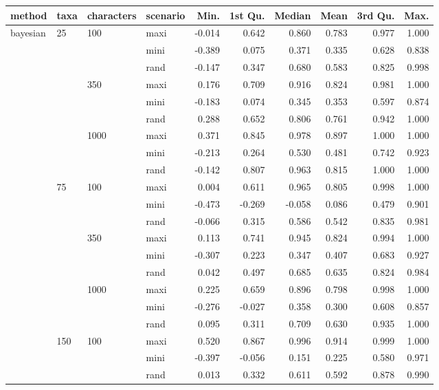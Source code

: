 \begin{longtable}{llllrrrrrr}
  \hline
method & taxa & characters & scenario & Min. & 1st Qu. & Median & Mean & 3rd Qu. & Max. \\ 
  \hline
bayesian & 25 & 100 & maxi & -0.014 & 0.642 & 0.860 & 0.783 & 0.977 & 1.000 \\ 
   &  &  & mini & -0.389 & 0.075 & 0.371 & 0.335 & 0.628 & 0.838 \\ 
   &  &  & rand & -0.147 & 0.347 & 0.680 & 0.583 & 0.825 & 0.998 \\ 
   &  & 350 & maxi & 0.176 & 0.709 & 0.916 & 0.824 & 0.981 & 1.000 \\ 
   &  &  & mini & -0.183 & 0.074 & 0.345 & 0.353 & 0.597 & 0.874 \\ 
   &  &  & rand & 0.288 & 0.652 & 0.806 & 0.761 & 0.942 & 1.000 \\ 
   &  & 1000 & maxi & 0.371 & 0.845 & 0.978 & 0.897 & 1.000 & 1.000 \\ 
   &  &  & mini & -0.213 & 0.264 & 0.530 & 0.481 & 0.742 & 0.923 \\ 
   &  &  & rand & -0.142 & 0.807 & 0.963 & 0.815 & 1.000 & 1.000 \\ 
   & 75 & 100 & maxi & 0.004 & 0.611 & 0.965 & 0.805 & 0.998 & 1.000 \\ 
   &  &  & mini & -0.473 & -0.269 & -0.058 & 0.086 & 0.479 & 0.901 \\ 
   &  &  & rand & -0.066 & 0.315 & 0.586 & 0.542 & 0.835 & 0.981 \\ 
   &  & 350 & maxi & 0.113 & 0.741 & 0.945 & 0.824 & 0.994 & 1.000 \\ 
   &  &  & mini & -0.307 & 0.223 & 0.347 & 0.407 & 0.683 & 0.927 \\ 
   &  &  & rand & 0.042 & 0.497 & 0.685 & 0.635 & 0.824 & 0.984 \\ 
   &  & 1000 & maxi & 0.225 & 0.659 & 0.896 & 0.798 & 0.998 & 1.000 \\ 
   &  &  & mini & -0.276 & -0.027 & 0.358 & 0.300 & 0.608 & 0.857 \\ 
   &  &  & rand & 0.095 & 0.311 & 0.709 & 0.630 & 0.935 & 1.000 \\ 
   & 150 & 100 & maxi & 0.520 & 0.867 & 0.996 & 0.914 & 0.999 & 1.000 \\ 
   &  &  & mini & -0.397 & -0.056 & 0.151 & 0.225 & 0.580 & 0.971 \\ 
   &  &  & rand & 0.013 & 0.332 & 0.611 & 0.592 & 0.878 & 0.990 \\ 

\end{longtable}
